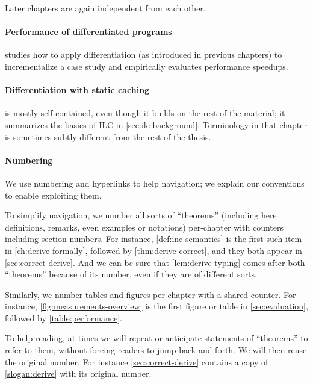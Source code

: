 Later chapters are again independent from each other.

\paragraph{Performance of differentiated programs}
 studies how to apply differentiation (as introduced in
previous chapters) to incrementalize a case study and empirically evaluates
performance speedups.

\paragraph{Differentiation with static caching}
 is mostly self-contained, even though it builds on the rest of the
material; it summarizes the basics of ILC in \cref{sec:ilc-background}.
Terminology in that chapter is sometimes subtly different from the rest of the thesis.



\paragraph{Numbering}
We use numbering and hyperlinks to help navigation; we explain our conventions
to enable exploiting them.

To simplify navigation, we number all sorts of ``theorems'' (including here
definitions, remarks, even examples or notations)
per-chapter with counters including section numbers. For
instance, \cref{def:inc-semantics} is the first such item in
\cref{ch:derive-formally}, followed by \cref{thm:derive-correct}, and they both
appear in \cref{sec:correct-derive}. And we can be sure that \cref{lem:derive-typing}
comes after both ``theorems'' because of its number, even if they are of different sorts.

Similarly, we number tables and figures per-chapter with a shared counter. For instance,
\cref{fig:measurements-overview} is the first figure or table in \cref{sec:evaluation},
followed by \cref{table:performance}.

To help reading, at times we will repeat or anticipate statements of
``theorems'' to refer to them, without forcing readers to jump back and forth.
We will then reuse the original number.
For instance \cref{sec:correct-derive} contains a copy of \cref{slogan:derive}
with its original number.

